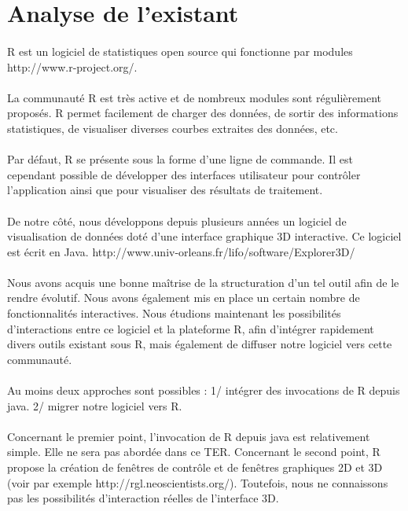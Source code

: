 \section{Analyse de l'existant}
\paragraph{}
R est un logiciel de statistiques open source qui fonctionne par modules
http://www.r-project.org/.
\paragraph{}
La communauté R est très active et de nombreux modules sont régulièrement proposés.
R permet facilement de charger des données, de sortir des informations statistiques, de visualiser
diverses courbes extraites des données, etc.
\paragraph{}
Par défaut, R se présente sous la forme d'une ligne de commande. Il est cependant possible de
développer des interfaces utilisateur pour contrôler l'application ainsi que pour visualiser des
résultats de traitement.
\paragraph{}
De notre côté, nous développons depuis plusieurs années un logiciel de visualisation de données
doté d'une interface graphique 3D interactive. Ce logiciel est écrit en Java.
http://www.univ-orleans.fr/lifo/software/Explorer3D/
\paragraph{}
Nous avons acquis une bonne maîtrise de la structuration d'un tel outil afin de le rendre évolutif.
Nous avons également mis en place un certain nombre de fonctionnalités interactives.
Nous étudions maintenant les possibilités d'interactions entre ce logiciel et la plateforme R, afin
d'intégrer rapidement divers outils existant sous R, mais également de diffuser notre logiciel vers
cette communauté.
\paragraph{}
Au moins deux approches sont possibles : 1/ intégrer des invocations de R depuis java. 2/ migrer
notre logiciel vers R.
\paragraph{}
Concernant le premier point, l'invocation de R depuis java est relativement simple. Elle ne sera pas
abordée dans ce TER. Concernant le second point, R propose la création de fenêtres de contrôle et
de fenêtres graphiques 2D et 3D (voir par exemple http://rgl.neoscientists.org/). Toutefois, nous ne
connaissons pas les possibilités d'interaction réelles de l'interface 3D.
